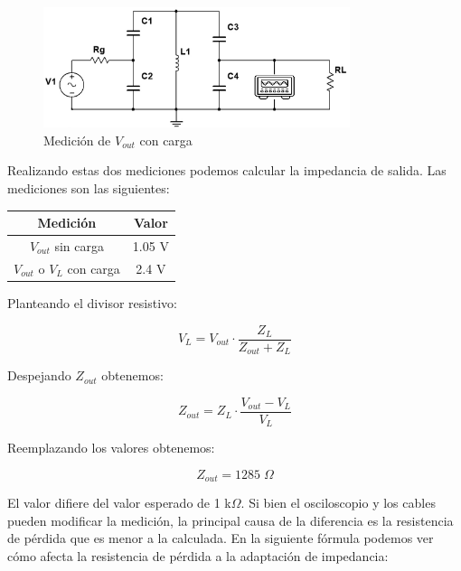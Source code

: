 % 
\begin{figure}[h]
    \centering
    \includegraphics[width=0.8\textwidth]{Imagenes/medicion_zout2.png}
    \caption{Medición de $V_{out}$ con carga}
    \label{fig: Segundo esquema de la medición de la impedancia de salida}
\end{figure}




Realizando estas dos mediciones podemos calcular la impedancia de salida. Las mediciones son las siguientes:

\begin{table}[h]
    \centering
    \begin{tabular}{|c|c|}
    \hline
    \rowcolor[HTML]{C0C0C0} 
    \textbf{Medición} & \textbf{Valor} \\ \hline
    $V_{out}$ sin carga            & 1.05  V         \\ \hline
    $V_{out}$ o $V_{L}$ con carga         & 2.4 V         \\ \hline
    \end{tabular}
\end{table}

Planteando el divisor resistivo:

\begin{equation}
    V_{L} = V_{out} \cdot \frac{Z_{L}}{Z_{out} + Z_L}
\end{equation}

Despejando $Z_{out}$ obtenemos:

\begin{equation}
    Z_{out} = Z_L \cdot \frac{V_{out} - V_L}{V_L}
\end{equation}

Reemplazando los valores obtenemos:

\begin{equation}
    \boxed{Z_{out} = 1285\; \Omega}
\end{equation}

El valor difiere del valor esperado de 1 k$\Omega$. Si bien el osciloscopio y los cables pueden modificar la medición, la principal causa de la diferencia es la resistencia de pérdida
que es menor a la calculada. En la siguiente fórmula podemos ver cómo afecta la resistencia de pérdida a la adaptación de impedancia:

